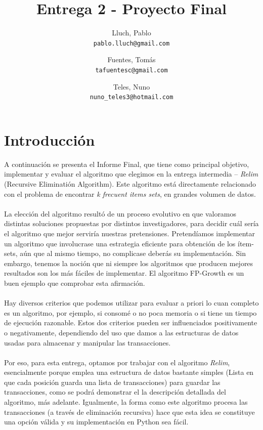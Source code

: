 \documentclass[12pt,spanish]{article}
\title{Entrega 2 - Proyecto Final}
\author{
  Lluch, Pablo\\
  \texttt{pablo.lluch@gmail.com}
  \and
  Fuentes, Tomás\\
  \texttt{tafuentesc@gmail.com}
  \and
  Teles, Nuno\\
  \texttt{nuno\_teles3@hotmail.com}
}
\begin{document}
\maketitle
\newpage

\section{Introducci\'on}

A continuación se presenta el Informe Final, que tiene como principal objetivo, implementar y evaluar el  algoritmo que elegimos en la entrega intermedia – \emph{Relim} (Recursive Eliminatión Algorithm). Este algoritmo está directamente relacionado con el problema de encontrar \emph{k frecuent items sets}, en grandes volumen de datos.
\\\\
La elección del algoritmo resultó de un proceso evolutivo en que valoramos distintas soluciones propuestas por distintos investigadores, para decidir cuál sería el algoritmo que mejor serviría nuestras pretensiones. Pretendíamos implementar un algoritmo que involucrase una estrategia eficiente para obtención de los ítem-sets, aún que al mismo tiempo, no complicase deberás su implementación. Sin embargo, tenemos la noción que ni siempre los algoritmos que producen mejores resultados son los más fáciles de implementar. El algoritmo FP-Growth es un buen ejemplo que comprobar esta afirmación.
\\\\
Hay diversos criterios que podemos utilizar para evaluar a priori lo cuan completo es un algoritmo, por ejemplo, si consomé o no poca memoria o si tiene un tiempo de ejecución razonable. Estos dos criterios pueden ser influenciados positivamente o negativamente, dependiendo del uso que damos a las estructuras de datos usadas para almacenar y manipular las transacciones. 
\\\\
Por eso, para esta entrega, optamos por trabajar con el algoritmo \emph{Relim}, esencialmente porque emplea una estructura de datos bastante simples (Lista en que cada posición guarda una lista de transacciones) para guardar las transacciones, como se podrá demonstrar el la descripción detallada del algoritmo, más adelante. Igualmente, la forma como este algoritmo procesa las transacciones (a través de eliminación recursiva) hace que esta idea se constituye una opción válida y su implementación en Python sea fácil.     
\\\\
\end{document}
